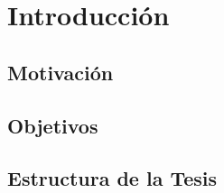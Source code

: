 \chapter{Introducción}\label{ch:introduction}

\section{Motivación}


\section{Objetivos}

\section{Estructura de la Tesis}

%
